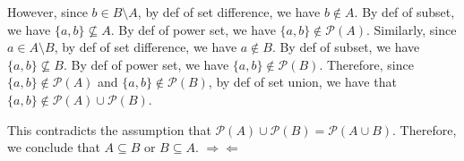 \documentclass[11pt]{article}
\begin{document}
{\begin{itemize}
      However, since
      $b \in B \setminus A$, by def of set difference, we have
      $b \notin A$. By def of subset, we have
      $\{a,b\} \nsubseteq A$. By def of power set, we have
      $\{a,b\} \notin \mathcal{P}(A)$.
      Similarly, since
      $a \in A \setminus B$, by def of set difference, we have
      $a \notin B$. By def of subset, we have
      $\{a,b\} \nsubseteq B$. By def of power set, we have
      $\{a,b\} \notin \mathcal{P}(B)$.
      Therefore,
      since $\{a,b\} \notin \mathcal{P}(A)$ and
      $\{a,b\} \notin \mathcal{P}(B)$,
      by def of set union, we have that
      $\{a,b\} \notin \mathcal{P}(A) \cup \mathcal{P}(B)$.

      This contradicts the assumption that
      $\mathcal{P}(A) \cup \mathcal{P}(B) = \mathcal{P}(A \cup B)$.
      Therefore, we conclude that $A \subseteq B$ or $B \subseteq A$.
      $\Rightarrow\Leftarrow$
  \end{itemize}
}
\end{document}

